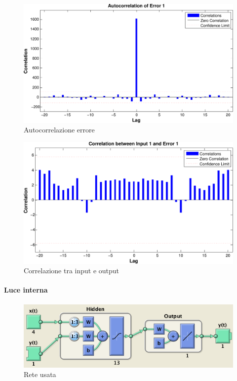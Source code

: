 \begin{figure}[htbp]
  \centering
  \includegraphics[scale=0.5]{images/timeseries/energia/autocorrelations.pdf}
  \caption{Autocorrelazione errore}
\end{figure}

\begin{figure}[htbp]
  \centering
  \includegraphics[scale=0.5]{images/timeseries/energia/correlations.pdf}
  \caption{Correlazione tra input e output}
\end{figure}


\paragraph{Luce interna}

\begin{figure}[htbp]
  \centering
  \includegraphics[scale=0.5]{images/timeseries/inlight/net.png}
  \caption{Rete usata}
\end{figure}

